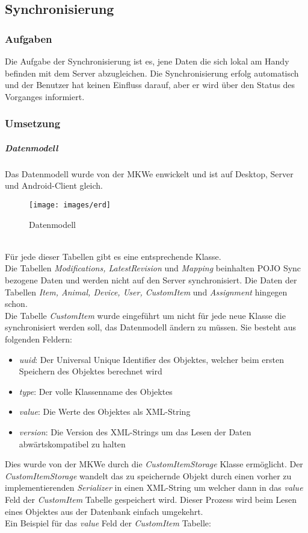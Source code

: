 
\subsection{Synchronisierung}

\subsubsection{Aufgaben}
Die Aufgabe der Synchronisierung ist es, jene Daten die sich lokal am Handy befinden mit dem Server abzugleichen. Die Synchronisierung erfolg automatisch und der Benutzer hat keinen Einfluss darauf, aber er wird über den Status des Vorganges informiert.

\subsubsection{Umsetzung}

\subparagraph{Datenmodell}
Das Datenmodell wurde von der MKWe enwickelt und ist auf Desktop, Server und Android-Client gleich.
\begin{figure}[htbp]
\centering
\texttt{[image: images/erd]}
\caption{Datenmodell}
\end{figure}
\\
Für jede dieser Tabellen gibt es eine entsprechende Klasse. \\[0.5em]
Die Tabellen \textit{Modifications, LatestRevision} und \textit{Mapping} beinhalten POJO Sync bezogene Daten und werden nicht auf den Server synchronisiert. Die Daten der Tabellen \textit{Item, Animal, Device, User, CustomItem} und \textit{Assignment} hingegen schon.\\[0.5em]
Die Tabelle \textit{CustomItem} wurde eingeführt um nicht für jede neue Klasse die synchronisiert werden soll, das Datenmodell ändern zu müssen. Sie besteht aus folgenden Feldern:
\begin{itemize}
\item{\textit{uuid}: Der Universal Unique Identifier des Objektes, welcher beim ersten Speichern des Objektes berechnet wird}
\item{\textit{type}: Der volle Klassenname des Objektes}
\item{\textit{value}: Die Werte des Objektes als XML-String}
\item{\textit{version}: Die Version des XML-Strings um das Lesen der Daten abwärtskompatibel zu halten}
\end{itemize}
Dies wurde von der MKWe durch die \textit{CustomItemStorage} Klasse ermöglicht. Der \textit{CustomItemStorage} wandelt das zu speichernde Objekt durch einen vorher zu implementierenden \textit{Serializer} in einen XML-String um welcher dann in das \textit{value} Feld der \textit{CustomItem} Tabelle gespeichert wird. Dieser Prozess wird beim Lesen eines Objektes aus der Datenbank einfach umgekehrt.\\[0.5em]
Ein Beispiel für das \textit{value} Feld der \textit{CustomItem} Tabelle:

